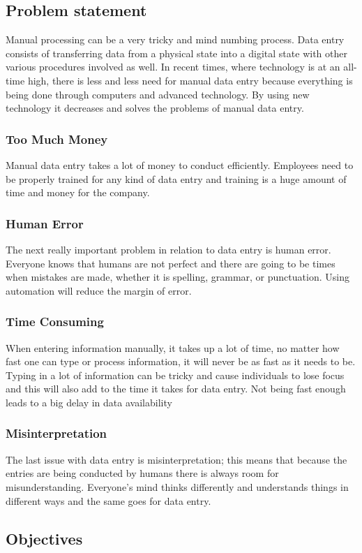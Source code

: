 \documentclass[12pt]{article}
\begin{document}
\subsection{Problem statement}
Manual processing can be a very tricky and mind numbing process. Data entry consists of transferring data from a physical state into a digital state with other various procedures involved as well. In recent times, where technology is at an all-time high, there is less and less need for manual data entry because everything is being done through computers and advanced technology. By using new technology it decreases and solves the problems of manual data entry.
\subsubsection{Too Much Money}
Manual data entry takes a lot of money to conduct efficiently. Employees need to be properly trained for any kind of data entry and training is a huge amount of time and money for the company.
\subsubsection{Human Error}
The next really important problem in relation to data entry is human error. Everyone knows that humans are not perfect and there are going to be times when mistakes are made, whether it is spelling, grammar, or punctuation. Using automation will reduce the margin of error.
\subsubsection{Time Consuming}
When entering information manually, it takes up a lot of time, no matter how fast one can type or process information, it will never be as fast as it needs to be. Typing in a lot of information can be tricky and cause individuals to lose focus and this will also add to the time it takes for data entry. Not being fast enough leads to a big delay in data availability
\subsubsection{Misinterpretation}
The last issue with data entry is misinterpretation; this means that because the entries are being conducted by humans there is always room for misunderstanding. Everyone’s mind thinks differently and understands things in different ways and the same goes for data entry.
\subsection{Objectives}
\end{document}
